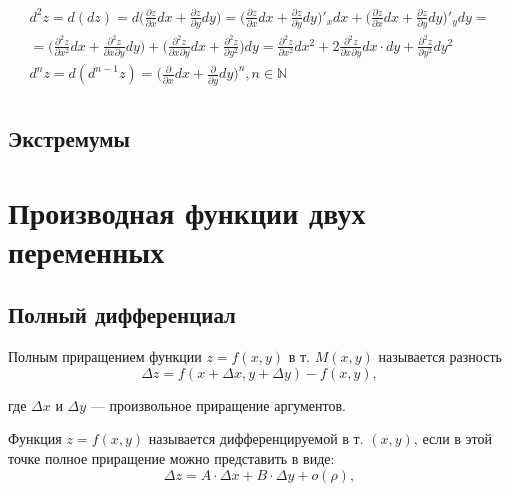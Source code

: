 \documentclass[a4paper,12pt,oneside]{extbook}
\theoremstyle{numbered}
\theoremstyle{unnumbered}
\theoremstyle{named}
\theoremstyle{unnumbered}
\theoremstyle{named}
\theoremstyle{named}
\theoremstyle{named}
\begin{document}
\begin{gather*}
    d^2 z = d(dz) =
    d\Big( \frac{\partial z}{\partial x}dx + \frac{\partial z}{\partial y}dy \Big) =
    \Big( \frac{\partial z}{\partial x}dx + \frac{\partial z}{\partial y}dy \Big)'_x dx + \Big( \frac{\partial z}{\partial x}dx + \frac{\partial z}{\partial y}dy \Big)'_y dy = \\
    =\Big( \frac{\partial^2 z}{\partial x^2}dx + \frac{\partial^2 z}{\partial x \partial y}dy \Big) + \Big( \frac{\partial^2 z}{\partial x \partial y}dx + \frac{\partial^2 z}{\partial y^2} \Big)dy =
    \frac{\partial^2 z}{\partial x^2}dx^2 + 2 \frac{\partial^2 z}{\partial x \partial y}dx \cdot dy + \frac{\partial^2 z}{\partial y^2} dy^2 \\
    d^n z = d(d^{n - 1} z) = \Big( \frac{\partial}{\partial x}dx + \frac{\partial}{\partial y} dy \Big)^n, n \in \mathbb{N} \\
\end{gather*}

\subsection{Экстремумы}%
\label{sub:Экстремумы}



\section{Производная функции двух переменных}%
\label{sec:Производная функции двух переменных}

\subsection{Полный дифференциал}%
\label{sub:Полный дифференциал}

Полным приращением функции \(z = f(x, y)\) в т. \(M(x, y)\) называется разность
\begin{equation}
    \Delta z = f(x + \Delta x, y + \Delta y) - f(x, y),
\end{equation}

где \(\Delta x\) и \(\Delta y\) — произвольное приращение аргументов.

Функция \(z = f(x, y)\) называется дифференцируемой в т. \((x, y)\), если в этой точке полное приращение можно представить в виде:
\begin{equation}
    \Delta z = A \cdot \Delta x + B \cdot \Delta y + o(\rho),
\end{equation}
\end{document}
